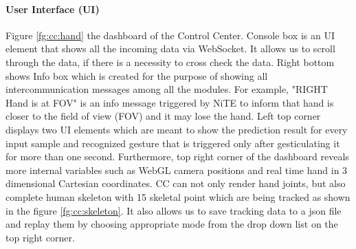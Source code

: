 \paragraph*{User Interface (UI) } Figure \ref{fg:cc:hand} the dashboard of the Control Center. Console box is an UI element that shows all the incoming data via WebSocket. It allows us to scroll through the data, if there is a necessity to cross check the data. Right bottom shows Info box which is created for the purpose of showing all intercommunication messages among all the modules. For example, "RIGHT Hand is at FOV" is an info message triggered by NiTE to inform that hand is closer to the field of view (FOV) and it may lose the hand. Left top corner displays two UI elements which are meant to show the prediction result for every input sample and recognized gesture  that is triggered only after gesticulating it for more than one second. Furthermore, top right corner of the dashboard reveals more internal variables such as WebGL camera positions and real time hand in 3 dimensional Cartesian coordinates. CC can not only render hand joints, but also complete human skeleton with 15 skeletal point which are being tracked as shown in the figure \ref{fg:cc:skeleton}. It also allows us to save tracking data to a json file and replay them by choosing appropriate mode from the drop down list on the top right corner.



